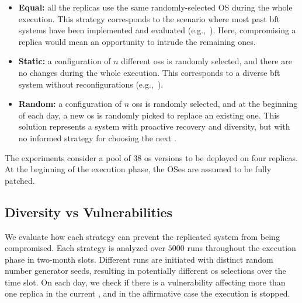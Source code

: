 \begin{itemize}
\item \textbf{Equal:} all the replicas use the same randomly-selected OS during the whole execution. 
This strategy corresponds to the scenario where most past \gls{bft} systems have been implemented and evaluated (e.g.,~\cite{Kotla:2010,Aublin:2015,Behl:2015,Veronese:2013,Behl:2017,Liu:2016,Yin:2003,Amir:2011,Bessani:2014,Clement:2009b}). 
Here, compromising a replica would mean an opportunity to intrude the remaining ones.

\item \textbf{Static:} a configuration of $n$ different \glspl{os} is randomly selected, and there are no changes during the whole execution. 
This corresponds to a diverse \gls{bft} system without reconfigurations (e.g.,~\cite{Rodrigues:2001}).

\item \textbf{Random:} a configuration of $n$ \glspl{os} is randomly selected, and at the beginning of each day, a new \gls{os} is randomly picked to replace an existing one. 
This solution represents a system with proactive recovery and diversity, but with no informed strategy for choosing the next \configuration.

\end{itemize}

The experiments consider a pool of 38 \gls{os} versions to be deployed on four replicas. 
At the beginning of the execution phase, the OSes are assumed to be fully patched.




\subsection{Diversity vs Vulnerabilities}
We evaluate how each strategy can prevent the replicated system from being compromised. 
Each strategy is analyzed over $5000$ runs throughout the execution phase in two-month slots. 
Different runs are initiated with distinct random number generator seeds, resulting in potentially different \gls{os} selections over the time slot. 
On each day, we check if there is a vulnerability affecting more than one replica in the current \configuration, and in the affirmative case the execution is stopped.

